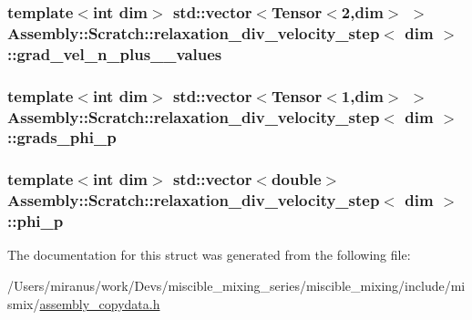 \subsubsection[{grad\+\_\+vel\+\_\+n\+\_\+plus\+\_\+1\+\_\+values}]{\setlength{\rightskip}{0pt plus 5cm}template$<$int dim$>$ std\+::vector$<$Tensor$<$2,dim$>$ $>$ {\bf Assembly\+::\+Scratch\+::relaxation\+\_\+div\+\_\+velocity\+\_\+step}$<$ dim $>$\+::grad\+\_\+vel\+\_\+n\+\_\+plus\+\_\+\_\+values}\label{struct_assembly_1_1_scratch_1_1relaxation__div__velocity__step_a8eb65ba7135f100ceadb24a86d5d32ae}
\hypertarget{struct_assembly_1_1_scratch_1_1relaxation__div__velocity__step_a9fae0fc0a91b6c248c1f19bc7907a8cd}{}
\subsubsection[{grads\+\_\+phi\+\_\+p}]{\setlength{\rightskip}{0pt plus 5cm}template$<$int dim$>$ std\+::vector$<$Tensor$<$1,dim$>$ $>$ {\bf Assembly\+::\+Scratch\+::relaxation\+\_\+div\+\_\+velocity\+\_\+step}$<$ dim $>$\+::grads\+\_\+phi\+\_\+p}\label{struct_assembly_1_1_scratch_1_1relaxation__div__velocity__step_a9fae0fc0a91b6c248c1f19bc7907a8cd}
\hypertarget{struct_assembly_1_1_scratch_1_1relaxation__div__velocity__step_a62319566acffdbef4ff0b505bae37b01}{}
\subsubsection[{phi\+\_\+p}]{\setlength{\rightskip}{0pt plus 5cm}template$<$int dim$>$ std\+::vector$<$double$>$ {\bf Assembly\+::\+Scratch\+::relaxation\+\_\+div\+\_\+velocity\+\_\+step}$<$ dim $>$\+::phi\+\_\+p}\label{struct_assembly_1_1_scratch_1_1relaxation__div__velocity__step_a62319566acffdbef4ff0b505bae37b01}


The documentation for this struct was generated from the following file\+:\begin{DoxyCompactItemize}
\item 
/\+Users/miranus/work/\+Devs/miscible\+\_\+mixing\+\_\+series/miscible\+\_\+mixing/include/mismix/\hyperlink{assembly__copydata_8h}{assembly\+\_\+copydata.\+h}\end{DoxyCompactItemize}
